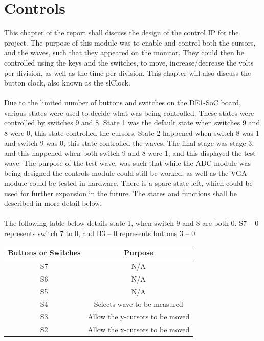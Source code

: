 \documentclass[a4paper,12pt]{article}
\begin{document}
\section{Controls}
\begin{flushleft}
This chapter of the report shall discuss the design of the control IP for the project. The purpose of this module was to enable and control both the cursors, and the waves, such that they appeared on the monitor. They could then be controlled using the keys and the switches, to move, increase/decrease the volts per division, as well as the time per division. This chapter will also discuss the button clock, also known as the slClock. \\ \- \\
Due to the limited number of buttons and switches on the DE1-SoC board, various states were used to decide what was being controlled. These states were controlled by switches 9 and 8. State 1 was the default state when switches 9 and 8 were 0, this state controlled the cursors. State 2 happened when switch 8 was 1 and switch 9 was 0, this state controlled the waves. The final stage was stage 3, and this happened when both switch 9 and 8 were 1, and this displayed the test wave. The purpose of the test wave, was such that while the ADC module was being designed the controls module could still be worked, as well as the VGA module could be tested in hardware. There is a spare state left, which could be used for further expansion in the future. The states and functions shall be described in more detail below. \\ \- \\
The following table below details state 1, when switch 9 and 8 are both 0.  S7 – 0 represents switch 7 to 0, and B3 – 0 represents buttons 3 – 0.\\
\begin{center}
\begin{table}[H]
	\centering
	\begin{tabular}{|c|c|}
	\hline 
	\textbf{Buttons or Switches} & \textbf{Purpose} \\ 
	\hline 
	S7 & N/A \\ 
	\hline 
	S6 & N/A \\ 
	\hline 
	S5 & N/A \\ 
	\hline 
	S4 & Selects wave to be measured \\ 
	\hline 
	S3 & Allow the y-cursors to be moved \\ 
	\hline 
	S2 & Allow the x-cursors to be moved \\ 

\end{tabular}
\end{table}
\end{center}
\end{flushleft}
\end{document}
